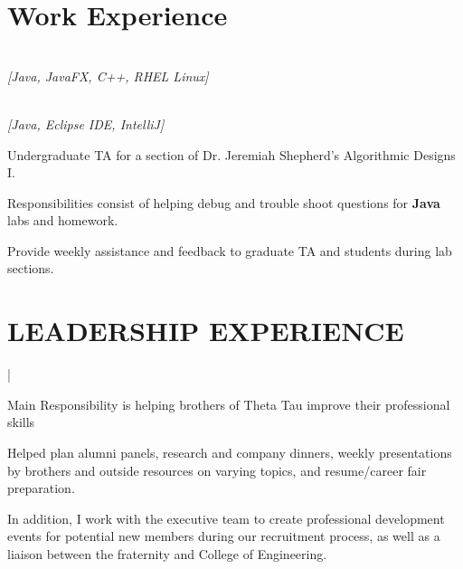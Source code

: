 \documentclass[letterpaper]{deedy-resume}
\begin{document}
\begin{minipage}[t]{0.69\textwidth} 

\section{Work Experience}

 \\  \emph{[Java, JavaFX, C++, RHEL Linux]}\\

\vspace{\topsep} 
\begin{tightitemize}
\item 
\end{tightitemize}

\sectionspace

 \\
 \color{gray} \emph{[Java, Eclipse IDE, IntelliJ]}\\

\vspace{\topsep} 
\begin{tightitemize}
\item Undergraduate TA for a section of Dr. Jeremiah Shepherd's Algorithmic Designs I.
\item Responsibilities consist of helping debug and trouble shoot questions for \textbf{Java} labs and homework.
\item Provide weekly assistance and feedback to graduate TA and students during lab sections.
\end{tightitemize}


\sectionspace

\section{LEADERSHIP EXPERIENCE}

 |

\begin{tightitemize}
\item Main Responsibility is helping brothers of Theta Tau improve their professional skills
\item Helped plan alumni panels, research and company dinners, weekly presentations by brothers and outside resources on varying topics, and resume/career fair preparation.
\item In addition, I work with the executive team to create professional development events for potential new members during our recruitment process, as well as a liaison between the fraternity and College of Engineering.
\end{tightitemize}


\end{minipage}
\end{document}
